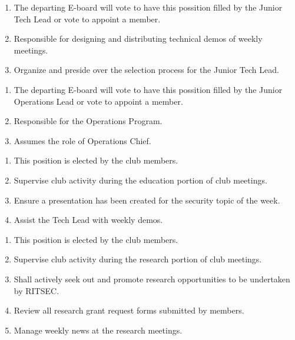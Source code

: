 
\begin{enumerate}
	\item The departing E-board will vote to have this possition filled by the Junior Tech Lead or vote to appoint a member.
	\item Responsible for designing and distributing technical demos of weekly meetings.
	\item Organize and preside over the selection process for the Junior Tech Lead.
\end{enumerate}


\begin{enumerate}
	\item The departing E-board will vote to have this possition filled by the Junior Operations Lead or vote to appoint a member.
	\item Responsible for the Operations Program.
	\item Assumes the role of Operations Chief.
\end{enumerate}


\begin{enumerate}
	\item This position is elected by the club members.
	\item Supervise club activity during the education portion of club meetings.
	\item Ensure a presentation has been created for the security topic of the week.
	\item Assist the Tech Lead with weekly demos.
\end{enumerate}


\begin{enumerate}
	\item This position is elected by the club members.
	\item Supervise club activity during the research portion of club meetings.
	\item Shall actively seek out and promote research opportunities to be undertaken by
	      RITSEC.
	\item Review all research grant request forms submitted by members.
	\item Manage weekly news at the research meetings.
\end{enumerate}
